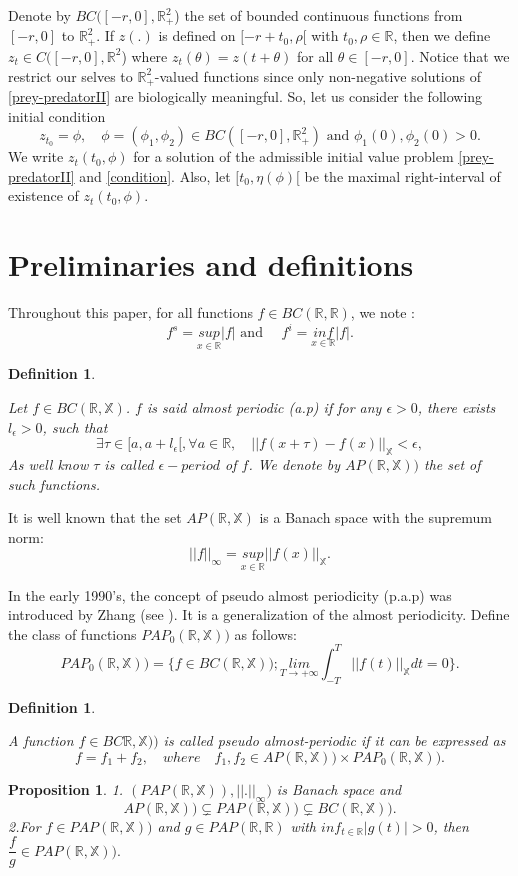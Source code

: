 \documentclass[[a4paper,10pt]{article}
\newcommand{\X}{\mathbb{X}}
\newcommand{\R}{\mathbb{R}}
\newtheorem{prop}[theorem]{Proposition}%
\newtheorem{definition}[theorem]{Definition}%
\begin{document}
 Denote by $BC ([-r, 0] , \R^2_+$) the set of bounded continuous functions from $[-r, 0]$ to $\R^2_+$. If $z(.)$ is defined on $[-r + t_0, \rho[$ with $t_0, \rho \in \R$, then we define $z_t \in C([-r, 0] , \R^2$) where $z_t(\theta) = z(t + \theta)$ for all $\theta \in [-r, 0]$. Notice that we restrict our selves to $\R^2_+$-valued functions since only non-negative solutions of \eqref{prey-predatorII} are biologically meaningful. So, let us consider the following initial condition
\begin{equation}\label{condition}
 z_{t_0} = \phi,\quad \phi=(\phi_1,\phi_2) \in BC ([-r, 0] , \R^2_+) \text{ and }\phi_1 (0),\phi_2(0) > 0. 
 \end{equation}
We write $z_t (t_0, \phi)$ for a solution of the admissible initial value problem \eqref{prey-predatorII} and \eqref{condition}. Also, let $[t_0, \eta(\phi)[$ be the maximal right-interval of existence of $z_t(t_0, \phi)$.
\section{Preliminaries and definitions}
Throughout this paper, for all functions $f\in BC(\R,\R)$, we note :
$$ f^s=\underset{x\in \R}{sup}|f|\text{ and }\quad f^i=\underset{x\in\R}{inf}|f|.$$


\begin{definition}\cite{chuanyi2003almost}\item
Let $f\in BC(\R,\X)$. $f$ is said almost periodic (a.p) if  for any $ \epsilon>0$, there exists $l_\epsilon >0$, such that
$$  \exists \tau \in [a,a+l_\epsilon[, \forall a\in \R, \quad ||f(x+\tau)-f(x)||_{\X}<\epsilon,$$
As well know $\tau$ is called $\epsilon-period$ of $f$. We denote by $AP(\R,\X))$  the set of such functions.
\end{definition}
 It is well known that the set $AP(\R,\X)$ is a Banach space with the supremum norm:
 $$||f||_{\infty}=\underset{x\in \R}{sup}||f(x)||_{\X}.$$


In the early 1990's, the concept of pseudo almost periodicity (p.a.p) was introduced by Zhang (see \cite{chuanyi2003almost}). It is a  generalization of the almost periodicity.  Define the class of functions $PAP_0 (\R,\X))$ as follows:$$ PAP_0 (\R,\X))=\bigg\{ f \in BC(\R,\X));
\underset{T\rightarrow +\infty }{lim} \int^T_{-T}||f(t)||_{\X} dt=0\bigg\}.$$

\begin{definition}\cite{chuanyi2003almost}\item A function $f \in BC\R,\X))$ is called pseudo almost-periodic if it can be expressed as 
$$f =f_1+f_2, \quad where \quad f_1,f_2\in AP(\R,\X))\times PAP_0(\R,\X)). $$
\end{definition}
 \begin{prop}\cite{chuanyi2003almost} 
1. $(PAP(\R,\X)),||.||_{\infty})$ is Banach space and 
 $$AP(\R,\X))\varsubsetneq PAP(\R,\X))\varsubsetneq BC(\R,\X)).$$
2.For $f\in PAP(\R,\X))$ and $g\in PAP(\R,\R)$ with $inf_{t\in \R}|g(t)|>0$, then $\dfrac{f}{g}\in PAP(\R,\X)).$
 \end{prop}
\end{document}
